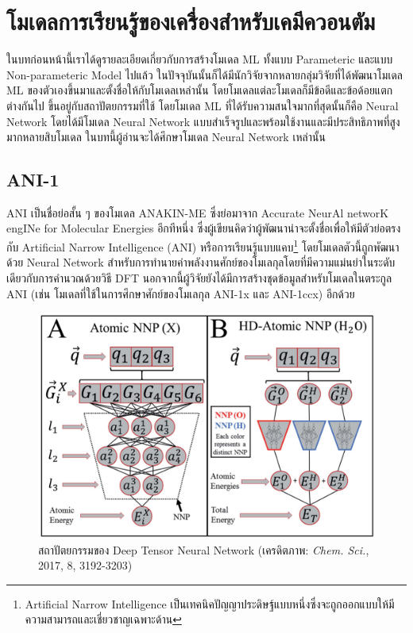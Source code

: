 

\chapter{โมเดลการเรียนรู้ของเครื่องสำหรับเคมีควอนตัม}
\label{ch:chem_ml}

ในบทก่อนหน้านี้เราได้ดูรายละเอียดเกี่ยวกับการสร้างโมเดล ML ทั้งแบบ Parameteric และแบบ Non-parameteric Model ไปแล้ว ในปัจจุบันนั้นก็ได้มีนักวิจัยจากหลายกลุ่มวิจัยที่ได้พัฒนาโมเดล ML ของตัวเองขึ้นมาและตั้งชื่อให้กับโมเดลเหล่านั้น โดยโมเดลแต่ละโมเดลก็มีข้อดีและข้อด้อยแตกต่างกันไป ขึ้นอยู่กับสถาปัตยกรรมที่ใช้ โดยโมเดล ML ที่ได้รับความสนใจมากที่สุดนั้นก็คือ Neural Network โดยได้มีโมเดล Neural Network แบบสำเร็จรูปและพร้อมใช้งานและมีประสิทธิภาพที่สูงมากหลายสิบโมเดล ในบทนี้ผู้อ่านจะได้ศึกษาโมเดล Neural Network เหล่านั้น

\section{ANI-1}
\label{sec:ani1}

ANI เป็นชื่อย่อสั้น ๆ ของโมเดล ANAKIN-ME ซึ่งย่อมาจาก Accurate NeurAl networK engINe for Molecular Energies อีกทีหนึ่ง ซึ่งผู้เขียนคิดว่าผู้พัฒนาน่าจะตั้งชื่อเพื่อให้มีตัวย่อตรงกับ Artificial Narrow Intelligence (ANI) หรือการเรียนรู้แบบแคบ\footnote{Artificial Narrow Intelligence เป็นเทคนิคปัญญาประดิษฐ์แบบหนึ่งซึ่งจะถูกออกแบบให้มีความสามารถและเชี่ยวชาญเฉพาะด้าน} โดยโมเดลตัวนี้ถูกพัฒนาด้วย Neural Network สำหรับการทำนายค่าพลังงานศักย์ของโมเลกุลโดยที่มีความแม่นยำในระดับเดียวกับการคำนวณด้วยวิธี DFT\autocite{smith2017} นอกจากนี้ผู้วิจัยยังได้มีการสร้างชุดข้อมูลสำหรับโมเดลในตระกูล ANI (เช่น โมเดลที่ใช้ในการศึกษาศักย์ของโมเลกุล ANI-1x และ ANI-1ccx) อีกด้วย\autocite{smith2020}

\begin{figure}[H]
    \centering
    \includegraphics[width=0.75\linewidth]{fig/ani_bpnn.png}
    \caption{สถาปัตยกรรมของ Deep Tensor Neural Network (เครดิตภาพ: \textit{Chem. Sci.}, 2017, 8, 3192-3203)}
    \label{fig:ani_bpnn_architect}
\end{figure}

